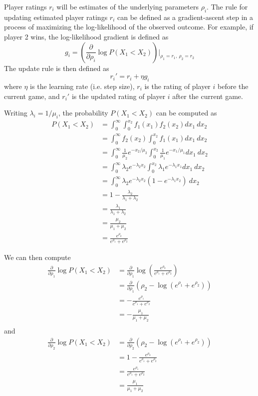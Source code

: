 \documentclass{article}
\begin{document}
	Player ratings $r_i$ will be estimates of the underlying parameters $\rho_i$. The rule for updating estimated player ratings $r_i$ can be defined as a gradient-ascent step in a process of maximizing the log-likelihood of the observed outcome. For example, if player 2 wins, the log-likelihood gradient is defined as
	$$g_i = \left(\frac{\partial}{\partial \rho_i} \log P(X_1 < X_2)\right) \bigg|_{\rho_1=r_1,\ \rho_2=r_2}$$
	The update rule is then defined as
	$$r_i' = r_i + \eta g_i$$
	where $\eta$ is the learning rate (i.e. step size), $r_i$ is the rating of player $i$ before the current game, and $r_i'$ is the updated rating of player $i$ after the current game.
	
	Writing $\lambda_i = 1 / \mu_i$, the probability $P(X_1 < X_2)$ can be computed as
	\begin{align*}
	P(X_1 < X_2) &= \int_0^{\infty} \int_0^{x_2} f_1(x_1) f_2(x_2) dx_1\ dx_2 \\
	&= \int_0^{\infty} f_2(x_2) \int_0^{x_2} f_1(x_1) dx_1\ dx_2 \\
	&= \int_0^{\infty} \frac1{\mu_2}e^{-x_2/\mu_2} \int_0^{x_2} \frac1{\mu_1}e^{-x_1/\mu_1} dx_1\ dx_2 \\
	&= \int_0^{\infty} \lambda_2 e^{-\lambda_2 x_2} \int_0^{x_2} \lambda_1 e^{-\lambda_1 x_1} dx_1\ dx_2 \\
	&= \int_0^{\infty} \lambda_2 e^{-\lambda_2 x_2} (1 - e^{-\lambda_1 x_2})\ dx_2 \\
	&= 1 - \frac{\lambda_2}{\lambda_1 + \lambda_2} \\
	&= \frac{\lambda_1}{\lambda_1 + \lambda_2} \\
	&= \frac{\mu_2}{\mu_1 + \mu_2} \\
	&= \frac{e^{\rho_2}}{e^{\rho_1} + e^{\rho_2}}
	\end{align*}
	
	We can then compute
	\begin{align*}
	\frac{\partial}{\partial \rho_1} \log P(X_1 < X_2)
	&= \frac{\partial}{\partial \rho_1} \log \left(\frac{e^{\rho_2}}{e^{\rho_1} + e^{\rho_2}}\right) \\
	&= \frac{\partial}{\partial \rho_1} (\rho_2 - \log (e^{\rho_1} + e^{\rho_2})) \\
	&= -\frac{e^{\rho_1}}{e^{\rho_1} + e^{\rho_2}} \\
	&= -\frac{\mu_1}{\mu_1 + \mu_2} \\
	\end{align*}
	and
	\begin{align*}
	\frac{\partial}{\partial \rho_2} \log P(X_1 < X_2)
	&= \frac{\partial}{\partial \rho_2} (\rho_2 - \log (e^{\rho_1} + e^{\rho_2})) \\
	&= 1 - \frac{e^{\rho_2}}{e^{\rho_1} + e^{\rho_2}} \\
	&= \frac{e^{\rho_1}}{e^{\rho_1} + e^{\rho_2}} \\
	&= \frac{\mu_1}{\mu_1 + \mu_2} \\
	\end{align*}
	
\end{document}
